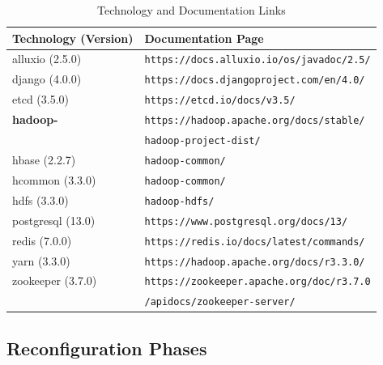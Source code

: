 \begin{table}[h]
    \centering
    \begin{tabular}{|l|l|}
        \hline
        \textbf{Technology (Version)} & \textbf{Documentation Page} \\
        \hline
        alluxio (2.5.0) & \texttt{https://docs.alluxio.io/os/javadoc/2.5/} \\
        django (4.0.0) & \texttt{https://docs.djangoproject.com/en/4.0/} \\
        etcd (3.5.0) & \texttt{https://etcd.io/docs/v3.5/} \\
        \textbf{hadoop-} & \texttt{https://hadoop.apache.org/docs/stable/}\\
        & \hspace{0.25cm} \texttt{hadoop-project-dist/} \\
        \hspace{0.15cm} hbase (2.2.7) & \hspace{0.5cm} \texttt{hadoop-common/} \\
        \hspace{0.15cm} hcommon (3.3.0) & \hspace{0.5cm} \texttt{hadoop-common/} \\
        \hspace{0.15cm} hdfs (3.3.0) & \hspace{0.5cm} \texttt{hadoop-hdfs/} \\
        postgresql (13.0) & \texttt{https://www.postgresql.org/docs/13/} \\
        redis (7.0.0) & \texttt{https://redis.io/docs/latest/commands/} \\
        yarn (3.3.0) & \texttt{https://hadoop.apache.org/docs/r3.3.0/} \\
        zookeeper (3.7.0) & \texttt{https://zookeeper.apache.org/doc/r3.7.0} \\
        & \hspace{0.25cm} \texttt{/apidocs/zookeeper-server/} \\
        \hline
    \end{tabular}
    \caption{Technology and Documentation Links}
    \label{tab:technology_documentation}
\end{table}

\subsection{Reconfiguration Phases} \label{sec:exp_results} 

